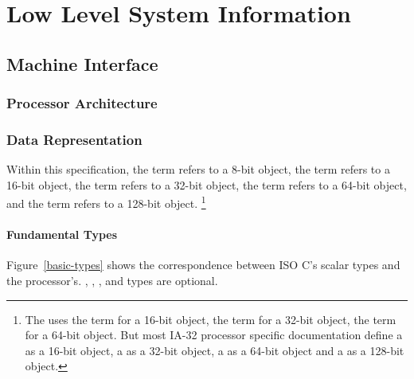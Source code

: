 \chapter{Low Level System Information}

\section{Machine Interface}

\subsection{Processor Architecture}

\subsection{Data Representation}

Within this specification, the term \emph{\textindex{\byte{}}} refers to
a 8-bit object, the term \emph{\textindex{\twobyte{}}} refers to a 16-bit
object, the term \emph{\textindex{\fourbyte{}}} refers to a 32-bit
object, the term \emph{\textindex{\eightbyte{}}} refers to a 64-bit
object, and the term \emph{\textindex{\sixteenbyte{}}} refers to a
128-bit object.%
\footnote{The \intelabi uses the term \emph{} for
  a 16-bit object, the term \emph{} for a 32-bit
  object, the term \emph{} for a 64-bit object.  But
  most IA-32 processor specific documentation define a
  \emph{} as a 16-bit object, a
  \emph{} as a 32-bit object, a
  \emph{} as a 64-bit object and a
  \emph{} as a 128-bit object.}

\subsubsection{Fundamental Types}

Figure~\ref{basic-types} shows the correspondence between ISO C's
scalar types and the processor's.  , ,
,  and  types are optional.

